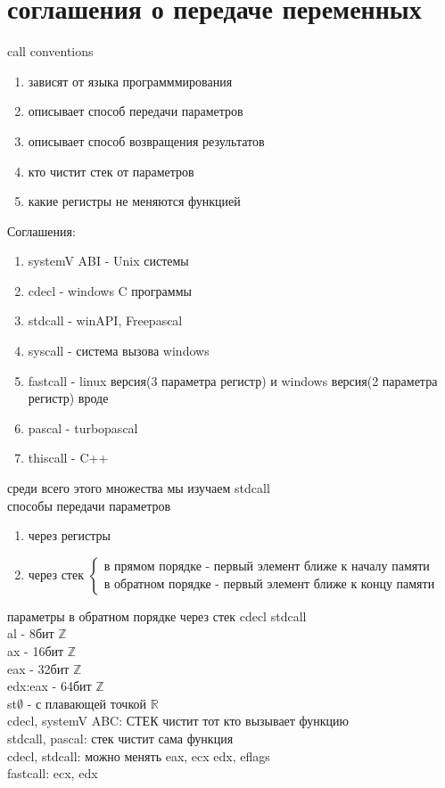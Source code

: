 \documentclass[a4paper, 12pt]{article}
\newcommand{\Z} {\mathbb{Z}}
\newcommand{\R} {\mathbb{R}}
\begin{document}
    \section*{соглашения о передаче переменных}
    call conventions
    \begin{enumerate}
        \item зависят от языка программмирования
        \item описывает способ передачи параметров
        \item описывает способ возвращения результатов
        \item кто чистит стек от параметров
        \item какие регистры не меняются функцией
    \end{enumerate}
    Соглашения:
    \begin{enumerate}
        \item systemV ABI - Unix системы
        \item cdecl - windows  C  программы
        \item stdcall - winAPI, Freepascal
        \item syscall - система вызова windows
        \item fastcall - linux версия(3 параметра регистр) и windows версия(2 параметра регистр) вроде
        \item pascal - turbopascal
        \item thiscall - C++
    \end{enumerate}
    среди всего этого множества мы изучаем stdcall \\
    способы передачи параметров
    \begin{enumerate}
        \item через регистры
        \item через стек $\begin{cases}
            \text{в прямом порядке - первый элемент ближе к началу памяти} \\
            \text{в обратном порядке - первый элемент ближе к концу памяти}
        \end{cases}$
    \end{enumerate}
    параметры в обратном порядке через стек cdecl stdcall\\
    al - 8бит $\Z$\\
    ax - 16бит $\Z$\\
    eax - 32бит $\Z$\\
    edx:eax - 64бит $\Z$\\
    st$\emptyset$ - с плавающей точкой $\R$ \\
    cdecl, systemV ABC:
    СТЕК чистит тот кто вызывает функцию \\
    stdcall, pascal: стек чистит сама функция \\
    cdecl, stdcall: можно менять eax, ecx edx, eflags \\
    fastcall: ecx, edx
    \newpage
\end{document}
